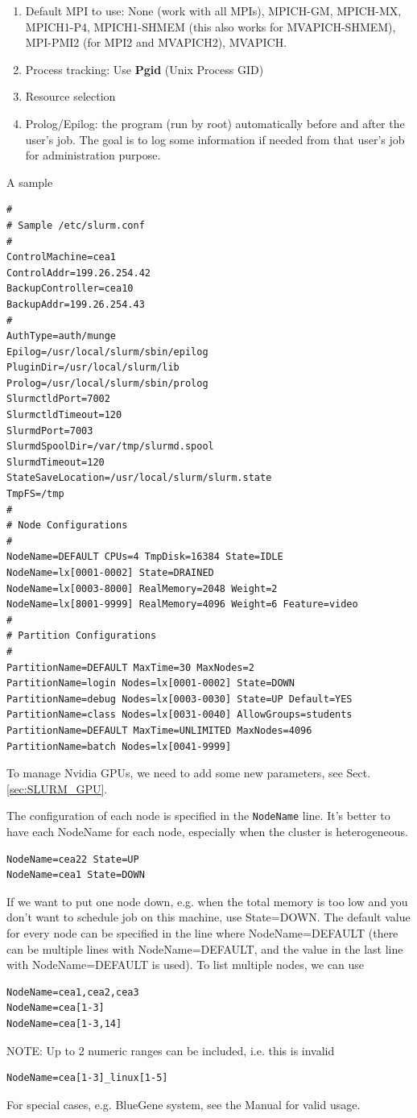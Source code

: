 \begin{enumerate}
  \item Default MPI to use: None (work with all MPIs), MPICH-GM,
MPICH-MX,  MPICH1-P4, MPICH1-SHMEM (this also works for MVAPICH-SHMEM), MPI-PMI2
(for MPI2 and MVAPICH2), MVAPICH.

  \item Process tracking: Use {\bf Pgid} (Unix Process GID)
  
  \item Resource selection
  
  \item Prolog/Epilog: the program (run by root) automatically before and after
  the user's job. The goal is to log some information if needed from that
  user's job for administration purpose.
\end{enumerate}


 A sample
\begin{verbatim}
#
# Sample /etc/slurm.conf
#
ControlMachine=cea1
ControlAddr=199.26.254.42
BackupController=cea10
BackupAddr=199.26.254.43
#
AuthType=auth/munge
Epilog=/usr/local/slurm/sbin/epilog
PluginDir=/usr/local/slurm/lib
Prolog=/usr/local/slurm/sbin/prolog
SlurmctldPort=7002
SlurmctldTimeout=120
SlurmdPort=7003
SlurmdSpoolDir=/var/tmp/slurmd.spool
SlurmdTimeout=120
StateSaveLocation=/usr/local/slurm/slurm.state
TmpFS=/tmp
#
# Node Configurations
#
NodeName=DEFAULT CPUs=4 TmpDisk=16384 State=IDLE
NodeName=lx[0001-0002] State=DRAINED
NodeName=lx[0003-8000] RealMemory=2048 Weight=2
NodeName=lx[8001-9999] RealMemory=4096 Weight=6 Feature=video
#
# Partition Configurations
#
PartitionName=DEFAULT MaxTime=30 MaxNodes=2
PartitionName=login Nodes=lx[0001-0002] State=DOWN
PartitionName=debug Nodes=lx[0003-0030] State=UP Default=YES
PartitionName=class Nodes=lx[0031-0040] AllowGroups=students
PartitionName=DEFAULT MaxTime=UNLIMITED MaxNodes=4096
PartitionName=batch Nodes=lx[0041-9999]
\end{verbatim}


To manage Nvidia GPUs, we need to add some new parameters, see
Sect.\ref{sec:SLURM_GPU}.

The configuration of each node is specified in the \verb!NodeName! line. It's
better to have each NodeName for each node, especially when the cluster is
heterogeneous. 
\begin{verbatim}
NodeName=cea22 State=UP
NodeName=cea1 State=DOWN
\end{verbatim}
If we want to put one node down, e.g. when the total memory is too low and you
don't want to schedule job on this machine, use State=DOWN. The default value
for every node can be specified in the line where NodeName=DEFAULT (there
can be multiple lines with NodeName=DEFAULT, and the value in the last line with
NodeName=DEFAULT is used). To list multiple nodes, we can use
\begin{verbatim}
NodeName=cea1,cea2,cea3
NodeName=cea[1-3]
NodeName=cea[1-3,14]
\end{verbatim}
NOTE: Up to 2 numeric ranges can be included, i.e. this is invalid
\begin{verbatim}
NodeName=cea[1-3]_linux[1-5]
\end{verbatim}
For special cases, e.g. BlueGene system, see the Manual for valid usage. 

